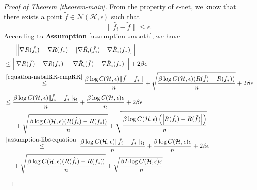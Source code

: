 \documentclass{article}
\begin{document}
\begin{proof}[Proof of Theorem \ref{theorem-main}]
From the property of $\epsilon$-net, we know that there exists a point
$\tilde{f}\in\mathcal{N}(\mathcal{H},\epsilon)$ such that $$\|\hat{f}_i-\tilde{f}\|\leq \epsilon.$$
According to \textbf{Assumption} \ref{assumption-smooth}, we have
\begin{align}
  \nonumber
    &~~~~~\left\|\nabla R(\hat{f}_i)-\nabla R(f_\ast)-[\nabla \hat{R}_i(\hat{f}_i)-\nabla \hat{R}_i(f_\ast)]\right\| \\
   \nonumber &\leq \left\|\nabla R(\tilde{f})-\nabla R(f_\ast)-[\nabla \hat{R}_i(\tilde{f})-\nabla \hat{R}_i(f_\ast)]\right\|+2\beta \epsilon\\
   \nonumber &\overset{\eqref{equation-nabalRR-empRR}}{\leq}
   \frac{\beta \log C(\mathcal{H},\epsilon)\|\tilde{f}-f_\ast\|}{n}+
   \sqrt{\frac{\beta \log C(\mathcal{H},\epsilon)(R(\tilde{f})-R(f_\ast))}{n}}+2\beta\epsilon\\
   \nonumber&\leq \frac{\beta \log C(\mathcal{H},\epsilon)\|\hat{f}_i-f_\ast\|_\mathcal{H}}{n}
   +\frac{\beta \log C(\mathcal{H},\epsilon)\epsilon}{n}+2\beta\epsilon\\
   \nonumber&~~~~~+\sqrt{\frac{\beta \log C(\mathcal{H},\epsilon)(R(\hat{f}_i)-R(f_\ast))}{n}}+
   \sqrt{\frac{\beta \log C(\mathcal{H},\epsilon)\left(\left|R(\hat{f}_i)-R(\tilde{f})\right|\right)}{n}}\\
   \nonumber &\overset{\eqref{assumption-libs-equation}}{\leq} \frac{\beta \log C(\mathcal{H},\epsilon)\|\hat{f}_i-f_\ast\|_\mathcal{H}}{n}+
   \frac{\beta \log C(\mathcal{H},\epsilon)\epsilon}{n}+2\beta\epsilon\\
   \label{equation-31}&~~~~+\sqrt{\frac{\beta \log C(\mathcal{H},\epsilon)(R(\hat{f}_i)-R(f_\ast))}{n}}+
   \sqrt{\frac{\beta L \log C(\mathcal{H},\epsilon)\epsilon}{n}}
\end{align}


\end{proof}
\end{document}
